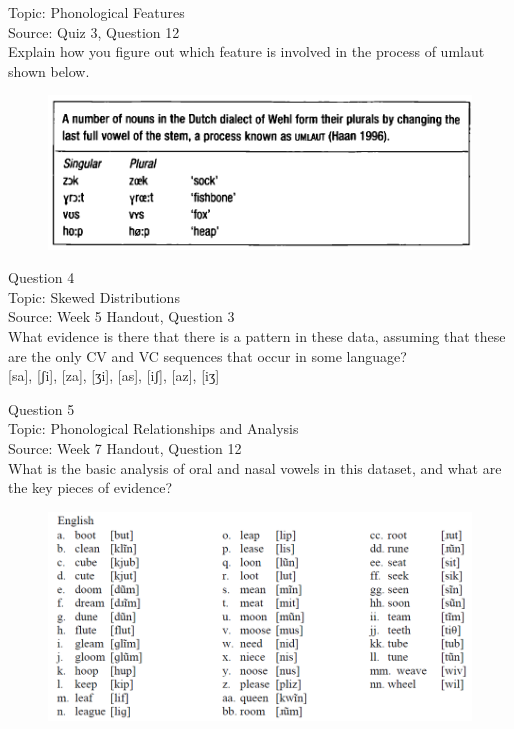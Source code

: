 \documentclass[12pt]{article}
\begin{document}
Topic: Phonological Features\\
Source: Quiz 3, Question 12\\

Explain how you figure out which feature is involved in the process of umlaut shown below.\\

\begin{figure}[H]
\includegraphics{../images/dutch.png}
\end{figure}

\newpage

{\large Question 4}\\

Topic: Skewed Distributions\\
Source: Week 5 Handout, Question 3\\

What evidence is there that there is a pattern in these data, assuming that these are the only CV and VC sequences that occur in some language?\\

{[sa]}, {[ʃi]}, {[za]}, {[ʒi]}, {[as]}, {[iʃ]}, {[az]}, {[iʒ]}


\newpage

{\large Question 5}\\

Topic: Phonological Relationships and Analysis\\
Source: Week 7 Handout, Question 12\\

What is the basic analysis of oral and nasal vowels in this dataset, and what are the key pieces of evidence?\\

\begin{figure}[H]
\includegraphics{../images/english12.png}
\end{figure}
\end{document}
